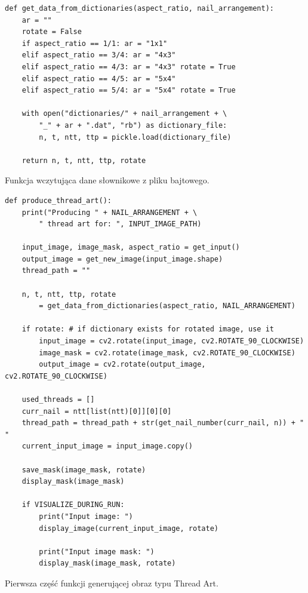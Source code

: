 \documentclass[a4paper, 12pt, polish, twoside]{extreport}
\begin{document}
        \begin{code}[H]
        \begin{verbatim}
def get_data_from_dictionaries(aspect_ratio, nail_arrangement):
    ar = ""
    rotate = False
    if aspect_ratio == 1/1: ar = "1x1"
    elif aspect_ratio == 3/4: ar = "4x3"
    elif aspect_ratio == 4/3: ar = "4x3" rotate = True
    elif aspect_ratio == 4/5: ar = "5x4"
    elif aspect_ratio == 5/4: ar = "5x4" rotate = True

    with open("dictionaries/" + nail_arrangement + \
        "_" + ar + ".dat", "rb") as dictionary_file:
        n, t, ntt, ttp = pickle.load(dictionary_file)

    return n, t, ntt, ttp, rotate
        \end{verbatim}
        \caption{Funkcja wczytująca dane słownikowe z pliku bajtowego.}
        \label{imp-art-read-dict-code}
        \end{code}
        
        \begin{code}[H]
        \begin{verbatim}
def produce_thread_art():
    print("Producing " + NAIL_ARRANGEMENT + \
        " thread art for: ", INPUT_IMAGE_PATH)
    
    input_image, image_mask, aspect_ratio = get_input()
    output_image = get_new_image(input_image.shape)
    thread_path = ""

    n, t, ntt, ttp, rotate 
        = get_data_from_dictionaries(aspect_ratio, NAIL_ARRANGEMENT)

    if rotate: # if dictionary exists for rotated image, use it
        input_image = cv2.rotate(input_image, cv2.ROTATE_90_CLOCKWISE)
        image_mask = cv2.rotate(image_mask, cv2.ROTATE_90_CLOCKWISE)
        output_image = cv2.rotate(output_image, cv2.ROTATE_90_CLOCKWISE)

    used_threads = []
    curr_nail = ntt[list(ntt)[0]][0][0]
    thread_path = thread_path + str(get_nail_number(curr_nail, n)) + " "
    current_input_image = input_image.copy()

    save_mask(image_mask, rotate)
    display_mask(image_mask)
    
    if VISUALIZE_DURING_RUN:
        print("Input image: ")
        display_image(current_input_image, rotate)
        
        print("Input image mask: ")
        display_mask(image_mask, rotate)
        \end{verbatim}
        \caption{Pierwsza część funkcji generującej obraz typu Thread Art.}
        \label{imp-art-algorithm-prep-code}
        \end{code}
        
\end{document}
